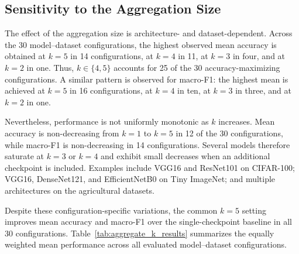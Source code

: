 \documentclass[runningheads]{llncs}
\begin{document}
\FloatBarrier
\subsection{Sensitivity to the Aggregation Size}
\label{sec:k_sensitivity}

The effect of the aggregation size is architecture- and dataset-dependent.
Across the 30 model--dataset configurations, the highest observed mean
accuracy is obtained at $k=5$ in 14 configurations, at $k=4$ in 11,
at $k=3$ in four, and at $k=2$ in one. Thus, $k\in\{4,5\}$ accounts for
25 of the 30 accuracy-maximizing configurations. A similar pattern is
observed for macro-F1: the highest mean is achieved at $k=5$ in 16
configurations, at $k=4$ in ten, at $k=3$ in three, and at $k=2$ in one.

Nevertheless, performance is not uniformly monotonic as $k$ increases.
Mean accuracy is non-decreasing from $k=1$ to $k=5$ in 12 of the 30
configurations, while macro-F1 is non-decreasing in 14 configurations.
Several models therefore saturate at $k=3$ or $k=4$ and exhibit small
decreases when an additional checkpoint is included. Examples include
VGG16 and ResNet101 on CIFAR-100; VGG16, DenseNet121, and EfficientNetB0
on Tiny ImageNet; and multiple architectures on the agricultural datasets.

Despite these configuration-specific variations, the common $k=5$
setting improves mean accuracy and macro-F1 over the single-checkpoint
baseline in all 30 configurations. Table~\ref{tab:aggregate_k_results}
summarizes the equally weighted mean performance across all evaluated
model--dataset configurations.

% 
\end{document}
